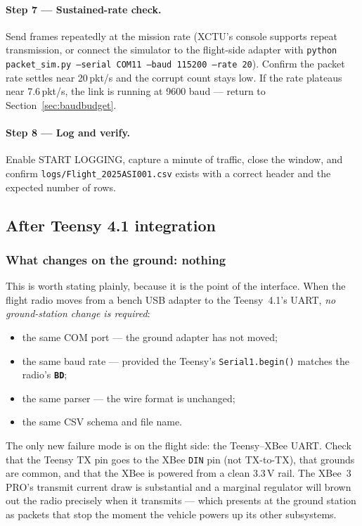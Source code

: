 \documentclass[11pt,a4paper]{article}
\newcommand{\file}[1]{\texttt{#1}}
\newcommand{\code}[1]{\texttt{#1}}
\newcommand{\param}[1]{\textbf{\texttt{#1}}}
\begin{document}
\paragraph{Step 7 --- Sustained-rate check.}
Send frames repeatedly at the mission rate (XCTU's console supports repeat
transmission, or connect the simulator to the flight-side adapter with
\code{python packet\_sim.py --serial COM11 --baud 115200 --rate 20}).
Confirm the packet rate settles near 20\,pkt/s and the corrupt count stays
low. If the rate plateaus near 7.6\,pkt/s, the link is running at 9600 baud
--- return to Section~\ref{sec:baudbudget}.

\paragraph{Step 8 --- Log and verify.}
Enable \textsf{START LOGGING}, capture a minute of traffic, close the window,
and confirm \file{logs/Flight\_2025ASI001.csv} exists with a correct header
and the expected number of rows.

\subsection{After Teensy 4.1 integration}
\label{sec:teensy}

\subsubsection{What changes on the ground: nothing}

This is worth stating plainly, because it is the point of the interface. When
the flight radio moves from a bench USB adapter to the Teensy~4.1's UART,
\emph{no ground-station change is required}:

\begin{itemize}
  \item the same COM port --- the ground adapter has not moved;
  \item the same baud rate --- provided the Teensy's \code{Serial1.begin()}
        matches the radio's \param{BD};
  \item the same parser --- the wire format is unchanged;
  \item the same CSV schema and file name.
\end{itemize}

The only new failure mode is on the flight side: the Teensy--XBee UART. Check
that the Teensy TX pin goes to the XBee \code{DIN} pin (not TX-to-TX), that
grounds are common, and that the XBee is powered from a clean 3.3\,V rail.
The XBee~3 PRO's transmit current draw is substantial and a marginal regulator
will brown out the radio precisely when it transmits --- which presents at the
ground station as packets that stop the moment the vehicle powers up its
other subsystems.
\end{document}
